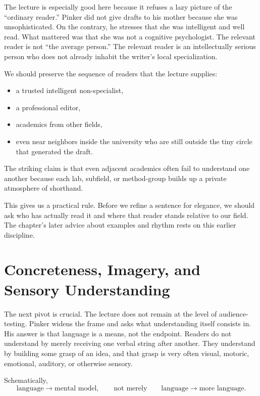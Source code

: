 The lecture is especially good here because it refuses a lazy picture of the ``ordinary reader.'' Pinker did not give drafts to his mother because she was unsophisticated. On the contrary, he stresses that she was intelligent and well read. What mattered was that she was not a cognitive psychologist. The relevant reader is not ``the average person.'' The relevant reader is an intellectually serious person who does not already inhabit the writer's local specialization.

We should preserve the sequence of readers that the lecture supplies:
\begin{itemize}
\item a trusted intelligent non-specialist,
\item a professional editor,
\item academics from other fields,
\item even near neighbors inside the university who are still outside the tiny circle that generated the draft.
\end{itemize}
The striking claim is that even adjacent academics often fail to understand one another because each lab, subfield, or method-group builds up a private atmosphere of shorthand.

This gives us a practical rule. Before we refine a sentence for elegance, we should ask who has actually read it and where that reader stands relative to our field. The chapter's later advice about examples and rhythm rests on this earlier discipline.

\section{Concreteness, Imagery, and Sensory Understanding}

The next pivot is crucial. The lecture does not remain at the level of audience-testing. Pinker widens the frame and asks what understanding itself consists in. His answer is that language is a means, not the endpoint. Readers do not understand by merely receiving one verbal string after another. They understand by building some grasp of an idea, and that grasp is very often visual, motoric, emotional, auditory, or otherwise sensory.

Schematically,
\begin{equation}
\text{language} \to \text{mental model},
\qquad
\text{not merely}
\qquad
\text{language} \to \text{more language}.
\end{equation}


